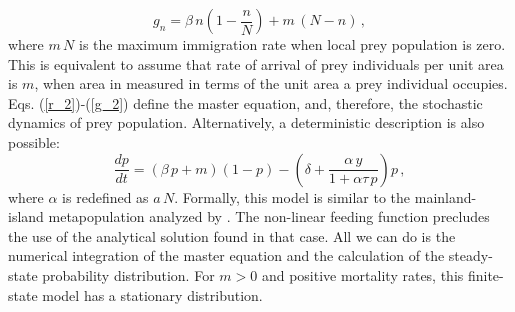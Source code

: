 \begin{equation}
g_{n} = \beta\,n\left(1-\frac{n}{N}\right)+m\,(N-n)\,,
\label{g_2}
\end{equation}
where $m\,N$ is the maximum immigration rate when local prey population is zero. This is equivalent to assume that rate of arrival of prey individuals per unit area is $m$, when area in measured in terms of the unit area a prey individual occupies. Eqs. (\ref{r_2})-(\ref{g_2}) define the master equation, and, therefore, the stochastic dynamics of prey population. Alternatively, a deterministic description is also possible:
\begin{equation}
\label{ex_3}
\frac{dp}{dt} = \left(\beta\,p+m\right)\left(1-p\right) - \left(\delta+\frac{\alpha\,y}{1+\alpha\tau\,p}\right)p\,,
\end{equation}
where $\alpha$ is redefined as $a\,N$. Formally, this model is similar to the mainland-island metapopulation analyzed by  \cite{AlonsoMcKane2002Extinction}. The non-linear feeding function precludes the use of the analytical solution found in that case. All we can do is the numerical integration of the master equation and the calculation of the steady-state probability distribution. For $m>0$ and positive mortality rates, this finite-state model has a stationary distribution.
\smallskip 
 
